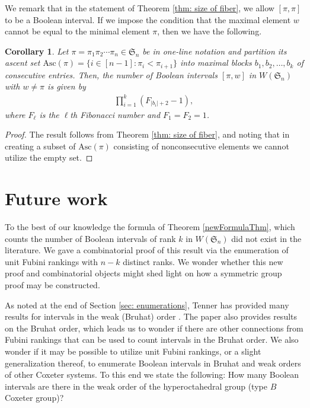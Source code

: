\documentclass[11pt,reqno]{amsart}
\newcommand{\Asc}{\mathrm{Asc}}
\newtheorem{corollary}{Corollary}[section]
\theoremstyle{definition}
\theoremstyle{notation}
\theoremstyle{openproblem}
\newcommand{\Sym}{\mathfrak{S}}
\begin{document}
We remark that in  the statement of Theorem \ref{thm: size of fiber}, we allow $[\pi,\pi]$ to be a Boolean interval. If we impose the condition that the maximal element $w$ cannot be equal to the minimal element $\pi$, then we have the following. 

\begin{corollary}
    Let $\pi = \pi_1 \pi_2 \cdots \pi_n \in \Sym_{n}$ be in one-line notation and partition its ascent set $\Asc(\pi)=\{i \in [n-1]: \pi_i<\pi_{i+1}\}$ into maximal blocks $b_1, b_2, \ldots, b_k$ of consecutive entries. 
Then, the number of Boolean intervals $[\pi,w]$ in $W(\Sym_n)$ with $w\neq \pi$ is given by
\begin{align*}
    \prod_{i=1}^k\left(F_{|b_i|+2}-1\right),
\end{align*}
where $F_{\ell}$ is the $\ell$th Fibonacci number and $F_1=F_2 = 1$.

\end{corollary}
\begin{proof}
    The result follows from Theorem \ref{thm: size of fiber}, and noting that in creating a subset of $\Asc(\pi)$ consisting of nonconsecutive elements we cannot utilize the empty set.
\end{proof}


\section{Future work}\label{sec:future}

To the best of our knowledge the formula of Theorem \ref{newFormulaThm}, which counts the number of Boolean intervals of rank $k$ in $W(\Sym_n)$ did not exist in the literature. 
We gave a combinatorial proof of this result via the enumeration of unit Fubini rankings with $n-k$ distinct ranks. 
We wonder whether this new proof and combinatorial objects might shed light on how a symmetric group proof may be constructed.

As noted at the end of Section \ref{sec: enumerations}, Tenner has provided many results for intervals in the weak (Bruhat) order \cite{Tenner_Intervals}. The paper also provides results on the Bruhat order, which leads us to wonder if there are other connections from Fubini rankings that can be used to count intervals in the Bruhat order.
We also wonder if it may be possible to utilize unit Fubini rankings, or a slight generalization thereof, to enumerate Boolean intervals in Bruhat and weak orders of other Coxeter systems. To this end we state the following: 
    How many Boolean intervals are there in the weak order of the hyperoctahedral group (type $B$ Coxeter group)?
\end{document}
